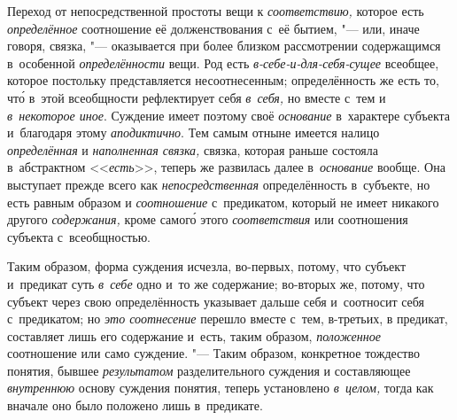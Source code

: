 Переход от непосредственной простоты вещи к {\em соответствию,} которое есть
{\em определённое} соотношение её долженствования с~её бытием, "--- или, иначе
говоря, связка, "--- оказывается при более близком рассмотрении содержащимся
в~особенной {\em определённости} вещи. Род есть {\em в-себе-и-для-себя-сущее}
всеобщее, которое постольку представляется несоотнесенным; определённость же
есть то, чт\'{о} в~этой всеобщности рефлектирует себя {\em в~себя,} но вместе с~тем
и {\em в~некоторое иное}. Суждение имеет поэтому своё {\em основание}
в~характере субъекта и~благодаря этому {\em аподиктично}. Тем самым отныне
имеется налицо {\em определённая} и {\em наполненная связка,} связка, которая
раньше состояла в~абстрактном <<{\em есть}>>, теперь же развилась далее
в~{\em основание} вообще. Она выступает прежде всего как {\em непосредственная}
определённость в~субъекте, но есть равным образом и {\em соотношение}
с~предикатом, который не имеет никакого другого {\em содержания,} кроме
самог\'{о} этого {\em соответствия} или соотношения субъекта с~всеобщностью.

Таким образом, форма суждения исчезла, во-первых, потому, что
субъект и~предикат суть {\em в~себе}
одно и~то же содержание; во-вторых же, потому, что субъект
через свою определённость указывает дальше себя и~соотносит себя
с~предикатом; но {\em это соотнесение} перешло вместе с~тем, в-третьих,
в предикат, составляет лишь его содержание и~есть, таким образом,
{\em положенное} соотношение или само суждение. "--- Таким образом,
конкретное тождество понятия, бывшее {\em результатом} разделительного суждения
и составляющее {\em внутреннюю} основу суждения понятия, теперь установлено
{\em в~целом,} тогда как вначале оно было положено лишь в~предикате.

